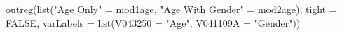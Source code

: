 \begin{Schunk}
\begin{Sinput}
  outreg(list("Age Only" = mod1age, "Age With Gender" = mod2age), tight = FALSE, varLabels = list(V043250 = "Age", V041109A = "Gender")) 
\end{Sinput}
\end{Schunk}
